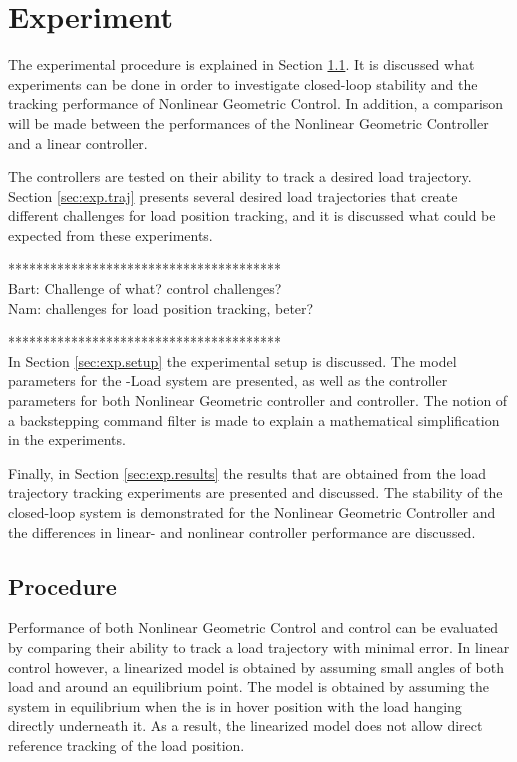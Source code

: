 \chapter{Experiment}\label{ch:exp}
The experimental procedure is explained in Section \ref{sec:exp.proc}. 
It is discussed what experiments can be done in order to investigate closed-loop stability and the tracking performance of Nonlinear Geometric Control.
In addition, a comparison will be made between the performances of the Nonlinear Geometric Controller and a linear  controller.

The controllers are tested on their ability to track a desired load trajectory. 
Section \ref{sec:exp.traj} presents several desired load trajectories that create different challenges for load position tracking, and it is discussed what could be expected from these experiments.

***************************************\\
Bart: Challenge of what? control challenges?\\
Nam: challenges for load position tracking, beter?

***************************************\\

In Section \ref{sec:exp.setup} the experimental setup is discussed. 
The model parameters for the -Load system are presented, as well as the controller parameters for both Nonlinear Geometric controller and  controller.
The notion of a backstepping command filter is made to explain a mathematical simplification in the experiments.

Finally, in Section \ref{sec:exp.results} the results that are obtained from the load trajectory tracking experiments are presented and discussed.
The stability of the closed-loop system is demonstrated for the Nonlinear Geometric Controller and the differences in linear- and nonlinear controller performance are discussed.

\newpage
\section{Procedure}\label{sec:exp.proc}
Performance of both Nonlinear Geometric Control and  control can be evaluated by comparing their ability to track a load trajectory with minimal error. 
In linear control however, a linearized model is obtained by assuming small angles of both load and  around an equilibrium point. 
The model is obtained by assuming the system in equilibrium when the  is in hover position with the load hanging directly underneath it.
As a result, the linearized model does not allow direct reference tracking of the load position. 

